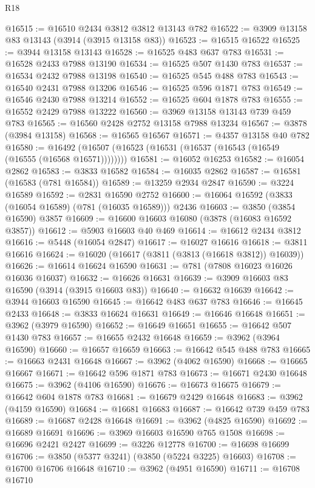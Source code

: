 \begin{lexlean}{R18}
\begin{coremodule}
@16515 := @16510 @2434 @3812 @3812 @13143 @782
@16522 := @3909 @13158 @83 @13143 (@3914 (@3915 @13158 @83))
@16523 := @16515 @16522
@16525 := @3944 @13158 @13143
@16528 := @16525 @483 @637 @783
@16531 := @16528 @2433 @7988 @13190
@16534 := @16525 @507 @1430 @783
@16537 := @16534 @2432 @7988 @13198
@16540 := @16525 @545 @488 @783
@16543 := @16540 @2431 @7988 @13206
@16546 := @16525 @596 @1871 @783
@16549 := @16546 @2430 @7988 @13214
@16552 := @16525 @604 @1878 @783
@16555 := @16552 @2429 @7988 @13222
@16560 := @3969 @13158 @13143 @739 @459 @783
@16565 := @16560 @2428 @2752 @13158 @7988 @13234
@16567 := @3878 (@3984 @13158)
@16568 := @16565 @16567
@16571 := @4357 @13158 @40 @782
@16580 := @16492 (@16507 (@16523 (@16531 (@16537 (@16543 (@16549 (@16555 (@16568 @16571))))))))
@16581 := @16052 @16253
@16582 := @16054 @2862
@16583 := @3833 @16582
@16584 := @16035 @2862
@16587 := @16581 (@16583 (@781 @16584))
@16589 := @13259 @2934 @2847
@16590 := @3224 @16589
@16592 := @2831 @16590 @2752
@16600 := @16064 @16592 (@3833 (@16054 @16589) (@781 (@16035 @16589))) @2436
@16603 := @3850 (@3854 @16590) @3857
@16609 := @16600 @16603 @16080 (@3878 (@16083 @16592 @3857))
@16612 := @5903 @16603 @40 @469
@16614 := @16612 @2434 @3812
@16616 := @5448 (@16054 @2847)
@16617 := @16027 @16616
@16618 := @3811 @16616
@16624 := @16020 (@16617 (@3811 (@3813 (@16618 @3812)) @16039))
@16626 := @16614 @16624 @16590
@16631 := @781 (@7808 @16023 @16026 @16036 @16037)
@16632 := @16626 @16631
@16639 := @3909 @16603 @83 @16590 (@3914 (@3915 @16603 @83))
@16640 := @16632 @16639
@16642 := @3944 @16603 @16590
@16645 := @16642 @483 @637 @783
@16646 := @16645 @2433
@16648 := @3833 @16624 @16631
@16649 := @16646 @16648
@16651 := @3962 (@3979 @16590)
@16652 := @16649 @16651
@16655 := @16642 @507 @1430 @783
@16657 := @16655 @2432 @16648
@16659 := @3962 (@3964 @16590)
@16660 := @16657 @16659
@16663 := @16642 @545 @488 @783
@16665 := @16663 @2431 @16648
@16667 := @3962 (@4062 @16590)
@16668 := @16665 @16667
@16671 := @16642 @596 @1871 @783
@16673 := @16671 @2430 @16648
@16675 := @3962 (@4106 @16590)
@16676 := @16673 @16675
@16679 := @16642 @604 @1878 @783
@16681 := @16679 @2429 @16648
@16683 := @3962 (@4159 @16590)
@16684 := @16681 @16683
@16687 := @16642 @739 @459 @783
@16689 := @16687 @2428 @16648
@16691 := @3962 (@4825 @16590)
@16692 := @16689 @16691
@16696 := @3969 @16603 @16590 @765 @1508
@16698 := @16696 @2421 @2427
@16699 := @3226 @12778
@16700 := @16698 @16699
@16706 := @3850 (@5377 @3241) (@3850 (@5224 @3225) @16603)
@16708 := @16700 @16706 @16648
@16710 := @3962 (@4951 @16590)
@16711 := @16708 @16710

\end{coremodule}
\end{lexlean}
